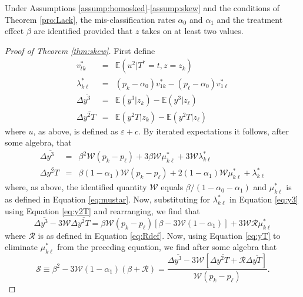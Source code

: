 \begin{thm}
  \label{thm:skew}
  Under Assumptions \ref{assump:homosked}-\ref{assump:skew} and the conditions of Theorem \ref{pro:Lack}, the mis-classification rates $\alpha_0$ and $\alpha_1$ and the treatment effect $\beta$ are identified provided that $z$ takes on at least two values.
\end{thm}

\begin{proof}[Proof of Theorem \ref{thm:skew}]
  First define 
  \begin{eqnarray}
    \label{eq:vstar}
  v^*_{tk} &=&  \mathbb{E}(u^2|T^*=t, z = z_k)\\
    \label{eq:lambda}
  \lambda_{k\ell}^* &=& (p_k - \alpha_0) v_{1k}^* - (p_\ell - \alpha_0) v_{1\ell}^*\\
    \label{eq:y3def}
    \Delta\overline{y^3} &=&  \mathbb{E}(y^3|z_k) - \mathbb{E}(y^3|z_\ell)\\
    \label{eq:y2Tdef}
    \Delta\overline{y^2T} &=&  \mathbb{E}(y^2T|z_k) - \mathbb{E}(y^2T|z_\ell)
  \end{eqnarray}
  where $u$, as above, is defined as $\varepsilon + c$.
  By iterated expectations it follows, after some algebra, that
  \begin{eqnarray}
    \label{eq:y3}
    \Delta\overline{y^3} &=& \beta^2 \mathcal{W} (p_k - p_\ell)  + 3 \beta \mathcal{W} \mu_{k\ell}^* + 3 \mathcal{W} \lambda^*_{k\ell}\\
    \label{eq:y2T}
    \Delta\overline{y^2T} &=& \beta(1-\alpha_1)\mathcal{W}(p_k - p_\ell) + 2(1-\alpha_1)\mathcal{W}\mu_{k\ell}^* + \lambda_{k\ell}^* 
  \end{eqnarray}
  where, as above, the identified quantity $\mathcal{W}$ equals $\beta/(1 - \alpha_0 - \alpha_1)$ and $\mu_{k\ell}^*$ is as defined in Equation \ref{eq:mustar}.
  Now, substituting for $\lambda^*_{k\ell}$ in Equation \ref{eq:y3} using Equation \ref{eq:y2T} and rearranging, we find that
  \begin{equation}
    \Delta \overline{y^3} - 3 \mathcal{W} \Delta\overline{y^2T} = \beta \mathcal{W} (p_k - p_\ell)\left[ \beta - 3 \mathcal{W} (1-\alpha_1) \right]+ 3\mathcal{W}\mathcal{R}\mu^*_{k\ell}
    \label{eq:diffy3}
  \end{equation}
  where $\mathcal{R}$ is as defined in Equation \ref{eq:Rdef}.
  Now, using Equation \ref{eq:yT} to eliminate $\mu_{k\ell}^*$ from the preceding equation, we find after some algebra that 
  \begin{equation}
    \mathcal{S} \equiv \beta^2 - 3\mathcal{W}(1-\alpha_1) (\beta + \mathcal{R}) = \frac{\Delta\overline{y^3} - 3 \mathcal{W}\left[ \Delta\overline{y^2T}+\mathcal{R}\Delta\overline{yT} \right]}{\mathcal{W}(p_k - p_\ell)}.

\end{equation}
\end{proof}
